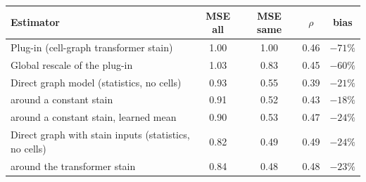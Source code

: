 \begin{tabular}{@{}lcccc@{}}
\toprule
Estimator & MSE all & MSE same & $\rho$ & bias \\
\midrule
Plug-in (cell-graph transformer stain) & 1.00 & 1.00 & 0.46 & $-71\%$ \\
Global rescale of the plug-in & 1.03 & 0.83 & 0.45 & $-60\%$ \\
Direct graph model (statistics, no cells) & 0.93 & 0.55 & 0.39 & $-21\%$ \\
\method{} around a constant stain & 0.91 & 0.52 & 0.43 & $-18\%$ \\
\method{} around a constant stain, learned mean & 0.90 & 0.53 & 0.47 & $-24\%$ \\
Direct graph with stain inputs (statistics, no cells) & 0.82 & 0.49 & 0.49 & $-24\%$ \\
\method{} around the transformer stain & 0.84 & 0.48 & 0.48 & $-23\%$ \\
\bottomrule
\end{tabular}
